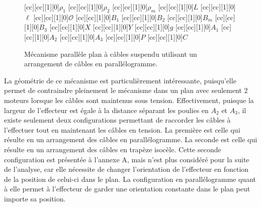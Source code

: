 \begin{figure}[t]
\centering
{}[cc][cc][1][0]{$\rho_1$}
[cc][cc][1][0]{$\rho_2$}
[cc][cc][1][0]{$\rho_m$}
[cc][cc][1][0]{$L$}
[cc][cc][1][0]{$\ell$}
[cc][cc][1][0]{$\mathcal{O}$}
[cc][cc][1][0]{$B_1$}
[cc][cc][1][0]{$B_2$}
[cc][cc][1][0]{$B_m$}
[cc][cc][1][0]{$B_3$}
[cc][cc][1][0]{$X$}
[cc][cc][1][0]{$Y$}
[cc][cc][1][0]{$g$}
[cc][cc][1][0]{$A_1$}
[cc][cc][1][0]{$A_2$}
[cc][cc][1][0]{$A_3$}
[cc][cc][1][0]{$P$}
[cc][cc][1][0]{$C$}
\caption[Mécanisme plan à 2DDL proposé]{\label{fig:chap1:geometrie}Mécanisme parallèle plan à câbles suspendu utilisant un arrangement de câbles en parallélogramme.}
\end{figure}
La géométrie de ce mécanisme est particulièrement intéressante, puisqu'elle permet de contraindre pleinement le mécanisme dans un plan avec seulement 2 moteurs lorsque les câbles sont maintenus sous tension. Effectivement, puisque la largeur de l'effecteur est égale à la distance séparant les poulies en $A_2$ et $A_3$, il existe seulement deux configurations permettant de raccorder les câbles à l'effectuer tout en maintenant les câbles en tension. La première est celle qui résulte en un arrangement des câbles en parallélogramme. La seconde est celle qui résulte en un arrangement des câbles en trapèze isocèle. Cette seconde configuration est présentée à l'annexe A, mais n'est plus considéré pour la suite de l'analyse, car elle nécessite de changer l'orientation de l'effecteur en fonction de la position de celui-ci dans le plan. La configuration en parallélogramme quant à elle permet à l'effecteur de garder une orientation constante dans le plan peut importe sa position. \par
